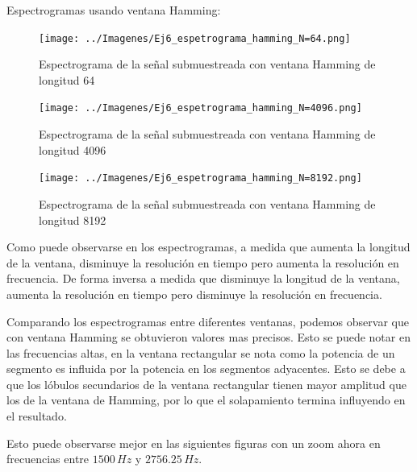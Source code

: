 \documentclass[10pt,spanish,a4paper,openany,notitlepage]{article}
\begin{document}
Espectrogramas usando ventana Hamming:

\begin{figure}[H] %
\begin{center}
\texttt{[image: ../Imagenes/Ej6\_espetrograma\_hamming\_N=64.png]}
\caption{Espectrograma de la señal submuestreada con ventana Hamming de longitud 64}
 \label{fig:hamm_N=64}
\end{center}
\end{figure}

\begin{figure}[H] %
\begin{center}
\texttt{[image: ../Imagenes/Ej6\_espetrograma\_hamming\_N=4096.png]}
\caption{Espectrograma de la señal submuestreada con ventana Hamming de longitud 4096}
 \label{fig:hamm_N=4096}
\end{center}
\end{figure}

\begin{figure}[H] %
\begin{center}
\texttt{[image: ../Imagenes/Ej6\_espetrograma\_hamming\_N=8192.png]}
\caption{Espectrograma de la señal submuestreada con ventana Hamming de longitud 8192}
 \label{fig:hamm_N=8192}
\end{center}
\end{figure}

Como puede observarse en los espectrogramas, a medida que aumenta
la longitud de la ventana, disminuye la resolución en tiempo pero aumenta
la resolución en frecuencia. De forma inversa a medida que disminuye la longitud de
la ventana, aumenta la resolución en tiempo pero disminuye la resolución
en frecuencia.

Comparando los espectrogramas entre diferentes ventanas, podemos observar
que con ventana Hamming se obtuvieron valores mas precisos. Esto se puede
notar en las frecuencias altas, en la ventana rectangular se nota como
la potencia de un segmento es influida por la potencia en los segmentos
adyacentes. Esto se debe a que los lóbulos secundarios de la ventana
rectangular tienen mayor amplitud que los de la ventana de Hamming, por
lo que el solapamiento termina influyendo en el resultado.

Esto puede observarse mejor en las siguientes figuras con un zoom ahora
en frecuencias entre $1500\, \unit{Hz}$ y $2756.25\, \unit{Hz}$.
\end{document}
